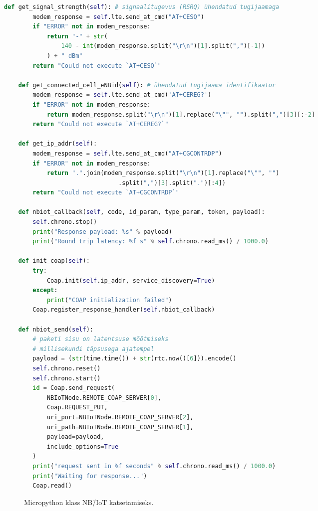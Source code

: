 \documentclass[12pt]{article}
\begin{document}
\begin{spacing}{0.8}
\begin{lstlisting}[language=Python]
    def get_signal_strength(self): # signaalitugevus (RSRQ) ühendatud tugijaamaga
        modem_response = self.lte.send_at_cmd("AT+CESQ")
        if "ERROR" not in modem_response:
            return "-" + str(
                140 - int(modem_response.split("\r\n")[1].split(",")[-1])
            ) + " dBm"
        return "Could not execute `AT+CESQ`"

    def get_connected_cell_eNBid(self): # ühendatud tugijaama identifikaator
        modem_response = self.lte.send_at_cmd('AT+CEREG?')
        if "ERROR" not in modem_response:
            return modem_response.split("\r\n")[1].replace("\"", "").split(",")[3][:-2]
        return "Could not execute `AT+CEREG?`"

    def get_ip_addr(self):
        modem_response = self.lte.send_at_cmd("AT+CGCONTRDP")
        if "ERROR" not in modem_response:
            return ".".join(modem_response.split("\r\n")[1].replace("\"", "")
                                .split(",")[3].split(".")[:4])
        return "Could not execute `AT+CGCONTRDP`"

    def nbiot_callback(self, code, id_param, type_param, token, payload):
        self.chrono.stop()
        print("Response payload: %s" % payload)
        print("Round trip latency: %f s" % self.chrono.read_ms() / 1000.0)

    def init_coap(self):
        try:
            Coap.init(self.ip_addr, service_discovery=True)
        except:
            print("COAP initialization failed")
        Coap.register_response_handler(self.nbiot_callback)

    def nbiot_send(self):
        # paketi sisu on latentsuse mõõtmiseks
        # millisekundi täpsusega ajatempel
        payload = (str(time.time()) + str(rtc.now()[6])).encode()
        self.chrono.reset()
        self.chrono.start()
        id = Coap.send_request(
            NBIoTNode.REMOTE_COAP_SERVER[0],
            Coap.REQUEST_PUT,
            uri_port=NBIoTNode.REMOTE_COAP_SERVER[2],
            uri_path=NBIoTNode.REMOTE_COAP_SERVER[1],
            payload=payload,
            include_options=True
        )
        print("request sent in %f seconds" % self.chrono.read_ms() / 1000.0)
        print("Waiting for response...")
        Coap.read()

        \end{lstlisting}
    \end{spacing}
    \begin{figure}[h]
    \caption{Micropython klass NB\=/IoT katsetamiseks.}
    \label{fig:codenbiot}
    \end{figure}
\end{document}
